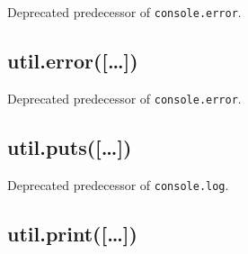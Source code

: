 \begin{Shaded}
\begin{Highlighting}[]
 \NormalTok{() }
\end{Highlighting}
\end{Shaded}

Deprecated predecessor of \texttt{console.error}.

\subsection{util.error({[}\ldots{}{]})}\label{util.error}

\begin{Shaded}
\begin{Highlighting}[]
 \NormalTok{() }
\end{Highlighting}
\end{Shaded}

Deprecated predecessor of \texttt{console.error}.

\subsection{util.puts({[}\ldots{}{]})}\label{util.puts}

\begin{Shaded}
\begin{Highlighting}[]
 \NormalTok{() }
\end{Highlighting}
\end{Shaded}

Deprecated predecessor of \texttt{console.log}.

\subsection{util.print({[}\ldots{}{]})}\label{util.print}

\begin{Shaded}
\begin{Highlighting}[]
 
\end{Highlighting}
\end{Shaded}

